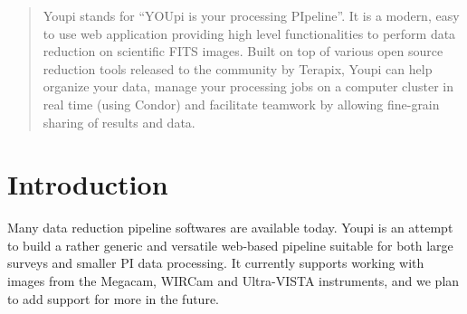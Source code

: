 \documentclass[11pt,twoside]{article}  %
\begin{document}
\setcounter{footnote}{3}


\begin{abstract} 
Youpi stands for ``YOUpi is your processing PIpeline''. It is a modern, 
easy to use web application providing high level functionalities to perform 
data reduction on scientific FITS images. Built on top of various open source 
reduction tools released to the community by Terapix, Youpi can help organize 
your data, manage your processing jobs on a computer cluster in real time 
(using Condor) and facilitate teamwork by allowing fine-grain sharing of 
results and data.
\end{abstract}


\section{Introduction}

Many data reduction pipeline softwares are available today. Youpi is an attempt to
build a rather generic and versatile web-based pipeline suitable for both large 
surveys and smaller PI data processing. It currently supports working with images 
from the Megacam, WIRCam and Ultra-VISTA instruments, and we plan to add support 
for more in the future. 
\end{document}
